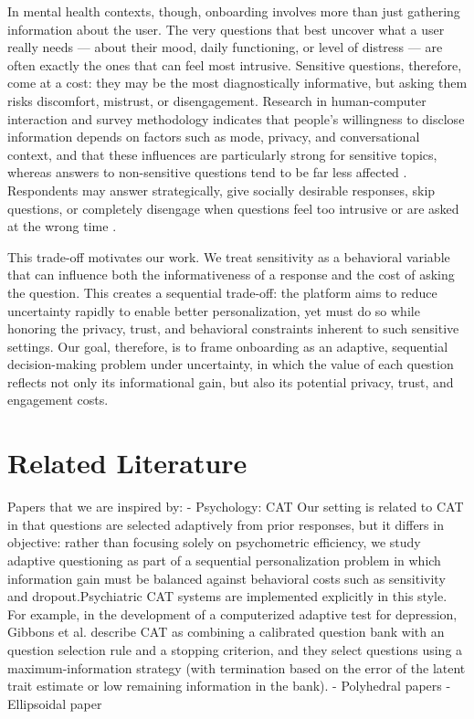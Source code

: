 \documentclass{article}
\begin{document}
In mental health contexts, though, onboarding involves more than just gathering information about the user. The very questions that best uncover what a user really needs --- about their mood, daily functioning, or level of distress --- are often exactly the ones that can feel most intrusive. Sensitive questions, therefore, come at a cost: they may be the most diagnostically informative, but asking them risks discomfort, mistrust, or disengagement. Research in human-computer interaction and survey methodology indicates that people's willingness to disclose information depends on factors such as mode, privacy, and conversational context, and that these influences are particularly strong for sensitive topics, whereas answers to non-sensitive questions tend to be far less affected \cite{lind2013survey_disclosure_computers}. Respondents may answer strategically, give socially desirable responses, skip questions, or completely disengage when questions feel too intrusive or are asked at the wrong time \cite{pickard2016self_disclosure_avatars, papneja2025self_disclosure_cai}.

This trade-off motivates our work. We treat sensitivity as a behavioral variable that can influence both the informativeness of a response and the cost of asking the question. This creates a sequential trade-off: the platform aims to reduce uncertainty rapidly to enable better personalization, yet must do so while honoring the privacy, trust, and behavioral constraints inherent to such sensitive settings. Our goal, therefore, is to frame onboarding as an adaptive, sequential decision-making problem under uncertainty, in which the value of each question reflects not only its informational gain, but also its potential privacy, trust, and engagement costs.



\newpage 
\chapter{Related Literature}
Papers that we are inspired by:
- Psychology: CAT Our setting is related to CAT in that questions are selected adaptively from prior responses, but it differs in objective: rather than focusing solely on psychometric efficiency, we study adaptive questioning as part of a sequential personalization problem in which information gain must be balanced against behavioral costs such as sensitivity and dropout.Psychiatric CAT systems are implemented explicitly in this style. For example, in the development of a computerized adaptive test for depression, Gibbons et al.\cite{gibbons2012catdepression}  describe CAT as combining a calibrated question bank with an question selection rule and a stopping criterion, and they select questions using a maximum-information strategy (with termination based on the error of the latent trait estimate or low remaining information in the bank).
- Polyhedral papers
- Ellipsoidal paper
\end{document}
